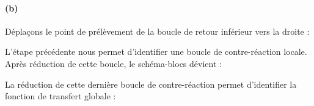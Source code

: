 \paragraph{(b)}
\begin{center}
    
\end{center}
Déplaçons le point de prélèvement de la boucle de retour inférieur vers 
la droite  :
\begin{center}
    
\end{center}
L'étape précédente nous permet d'identifier une boucle de contre-réaction 
locale. Après réduction de cette boucle, le schéma-blocs dévient :
\begin{center}
    
\end{center}
La réduction de cette dernière boucle de contre-réaction permet d'identifier 
la fonction de transfert globale :
\begin{center}
    
\end{center}
